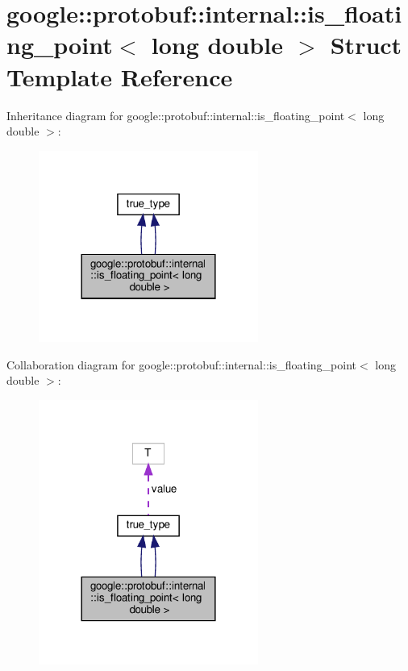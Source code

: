 \hypertarget{structgoogle_1_1protobuf_1_1internal_1_1is__floating__point_3_01long_01double_01_4}{}\section{google\+:\+:protobuf\+:\+:internal\+:\+:is\+\_\+floating\+\_\+point$<$ long double $>$ Struct Template Reference}
\label{structgoogle_1_1protobuf_1_1internal_1_1is__floating__point_3_01long_01double_01_4}


Inheritance diagram for google\+:\+:protobuf\+:\+:internal\+:\+:is\+\_\+floating\+\_\+point$<$ long double $>$\+:
\nopagebreak
\begin{figure}[H]
\begin{center}
\leavevmode
\includegraphics[width=204pt]{structgoogle_1_1protobuf_1_1internal_1_1is__floating__point_3_01long_01double_01_4__inherit__graph}
\end{center}
\end{figure}


Collaboration diagram for google\+:\+:protobuf\+:\+:internal\+:\+:is\+\_\+floating\+\_\+point$<$ long double $>$\+:
\nopagebreak
\begin{figure}[H]
\begin{center}
\leavevmode
\includegraphics[width=204pt]{structgoogle_1_1protobuf_1_1internal_1_1is__floating__point_3_01long_01double_01_4__coll__graph}
\end{center}
\end{figure}
